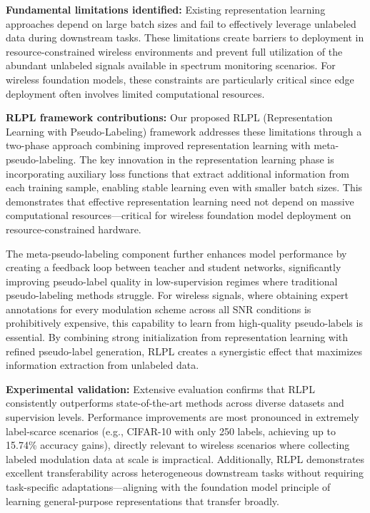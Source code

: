 \textbf{Fundamental limitations identified:} Existing representation learning approaches depend on large batch sizes and fail to effectively leverage unlabeled data during downstream tasks. These limitations create barriers to deployment in resource-constrained wireless environments and prevent full utilization of the abundant unlabeled signals available in spectrum monitoring scenarios. For wireless foundation models, these constraints are particularly critical since edge deployment often involves limited computational resources.

\textbf{RLPL framework contributions:} Our proposed RLPL (Representation Learning with Pseudo-Labeling) framework addresses these limitations through a two-phase approach combining improved representation learning with meta-pseudo-labeling. The key innovation in the representation learning phase is incorporating auxiliary loss functions that extract additional information from each training sample, enabling stable learning even with smaller batch sizes. This demonstrates that effective representation learning need not depend on massive computational resources—critical for wireless foundation model deployment on resource-constrained hardware.

The meta-pseudo-labeling component further enhances model performance by creating a feedback loop between teacher and student networks, significantly improving pseudo-label quality in low-supervision regimes where traditional pseudo-labeling methods struggle. For wireless signals, where obtaining expert annotations for every modulation scheme across all SNR conditions is prohibitively expensive, this capability to learn from high-quality pseudo-labels is essential. By combining strong initialization from representation learning with refined pseudo-label generation, RLPL creates a synergistic effect that maximizes information extraction from unlabeled data.

\textbf{Experimental validation:} Extensive evaluation confirms that RLPL consistently outperforms state-of-the-art methods across diverse datasets and supervision levels. Performance improvements are most pronounced in extremely label-scarce scenarios (e.g., CIFAR-10 with only 250 labels, achieving up to 15.74\% accuracy gains), directly relevant to wireless scenarios where collecting labeled modulation data at scale is impractical. Additionally, RLPL demonstrates excellent transferability across heterogeneous downstream tasks without requiring task-specific adaptations—aligning with the foundation model principle of learning general-purpose representations that transfer broadly.

